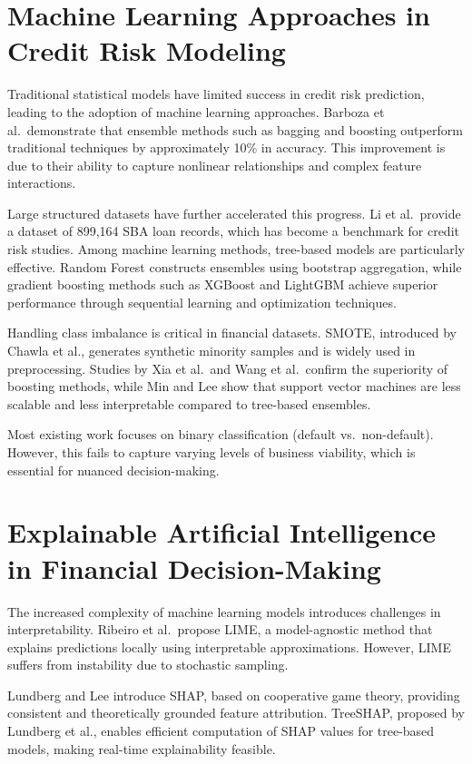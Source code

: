 \documentclass[12pt,a4paper]{report}
\begin{document}
\section{Machine Learning Approaches in Credit Risk Modeling}

Traditional statistical models have limited success in credit risk prediction, leading to the adoption of machine learning approaches. Barboza et al.\ demonstrate that ensemble methods such as bagging and boosting outperform traditional techniques by approximately 10\% in accuracy. This improvement is due to their ability to capture nonlinear relationships and complex feature interactions.

Large structured datasets have further accelerated this progress. Li et al.\ provide a dataset of 899,164 SBA loan records, which has become a benchmark for credit risk studies. Among machine learning methods, tree-based models are particularly effective. Random Forest constructs ensembles using bootstrap aggregation, while gradient boosting methods such as XGBoost and LightGBM achieve superior performance through sequential learning and optimization techniques.

Handling class imbalance is critical in financial datasets. SMOTE, introduced by Chawla et al., generates synthetic minority samples and is widely used in preprocessing. Studies by Xia et al.\ and Wang et al.\ confirm the superiority of boosting methods, while Min and Lee show that support vector machines are less scalable and less interpretable compared to tree-based ensembles.

Most existing work focuses on binary classification (default vs.\ non-default). However, this fails to capture varying levels of business viability, which is essential for nuanced decision-making.

\section{Explainable Artificial Intelligence in Financial Decision-Making}

The increased complexity of machine learning models introduces challenges in interpretability. Ribeiro et al.\ propose LIME, a model-agnostic method that explains predictions locally using interpretable approximations. However, LIME suffers from instability due to stochastic sampling.

Lundberg and Lee introduce SHAP, based on cooperative game theory, providing consistent and theoretically grounded feature attribution. TreeSHAP, proposed by Lundberg et al., enables efficient computation of SHAP values for tree-based models, making real-time explainability feasible.
\end{document}
